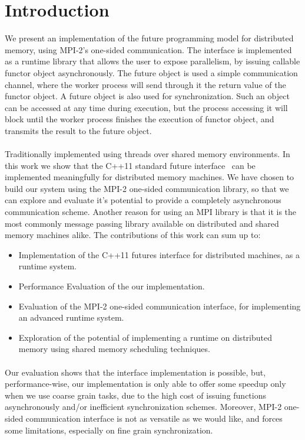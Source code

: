 \section*{Introduction}
We present an implementation of the future programming model for distributed memory,
using MPI-2's one-sided communication.  The interface is implemented as a runtime 
library that allows the user to  expose parallelism, by issuing callable functor object 
asynchronously.  The future object is used a simple communication channel, where the worker process 
will send through it the return value of the functor object. 
A future object is also used for synchronization. Such an object can be accessed at any time during execution,
but the process accessing it will block until the worker process finishes the execution of functor object, and
transmits the result to the future object.

\paragraph{}
Traditionally implemented using threads over shared memory environments.  
In this work we show that the C++11 standard future interface~\cite{CPP:Threads} can be implemented meaningfully 
for distributed memory machines.  We have chosen to build our system using the MPI-2 one-sided
communication library, so that we can explore and evaluate it's potential to provide a completely asynchronous
communication scheme.  Another reason for using an MPI library is that it is the most commonly message passing
library available on distributed and shared memory machines alike.  
The contributions of this work can sum up to:
\\
\begin{itemize}
	\item Implementation of the C++11 futures interface for distributed machines, as a runtime system.
	\item Performance Evaluation of the our implementation. 
	\item Evaluation of the MPI-2 one-sided communication interface, for implementing an advanced runtime system.
	\item Exploration of the potential of implementing a runtime on distributed memory using shared memory scheduling techniques.
\end{itemize}

\paragraph{}
Our evaluation shows that the interface implementation is possible, but, performance-wise,  our implementation 
is only able to offer some speedup only when we use coarse grain tasks, due to the high cost of issuing functions 
asynchronously and/or inefficient synchronization schemes. Moreover, MPI-2 one-sided communication interface is 
not as versatile as we would like, and forces some limitations, especially on fine grain synchronization.  

